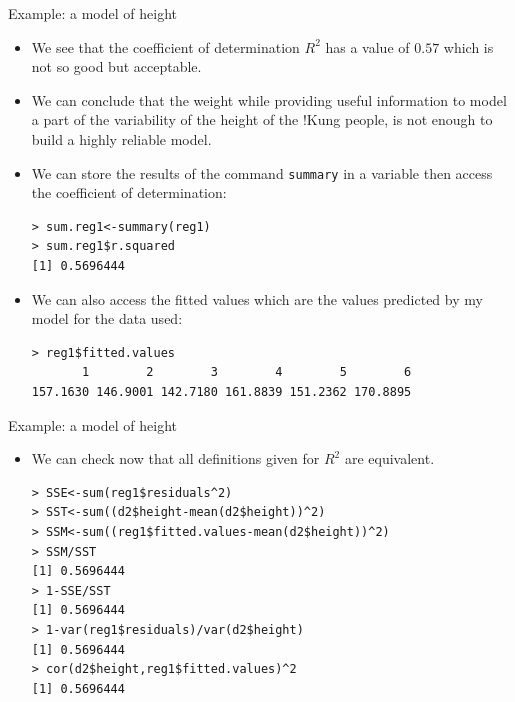\documentclass[handout]{beamer}
\begin{document}
\begin{frame}[fragile]{Example: a model of height}
\scriptsize{
\begin{itemize}
 \item We see that the coefficient of determination $R^2$ has a value of $0.57$ which is not so good but acceptable.
 
 
  \item We can conclude that the weight while providing useful information to model a part of the variability of the height of the !Kung people, is not enough to build a highly reliable model. 
  
  \item We can store the results of the command \verb+summary+ in a variable then access the coefficient of determination:
\begin{verbatim}
> sum.reg1<-summary(reg1)
> sum.reg1$r.squared
[1] 0.5696444  
\end{verbatim}

\item  We can also access the fitted values which are the values predicted by my model for the data used:
\begin{verbatim}
> reg1$fitted.values
       1        2        3        4        5        6      
157.1630 146.9001 142.7180 161.8839 151.2362 170.8895 
\end{verbatim}
 
 \end{itemize}
 

} 
\end{frame}



\begin{frame}[fragile]{Example: a model of height}
\scriptsize{
\begin{itemize}
 \item We can check now that all definitions given for $R^2$ are equivalent.
 
 \begin{verbatim}
> SSE<-sum(reg1$residuals^2)
> SST<-sum((d2$height-mean(d2$height))^2)
> SSM<-sum((reg1$fitted.values-mean(d2$height))^2)
> SSM/SST
[1] 0.5696444
> 1-SSE/SST
[1] 0.5696444
> 1-var(reg1$residuals)/var(d2$height)
[1] 0.5696444
> cor(d2$height,reg1$fitted.values)^2
[1] 0.5696444
 \end{verbatim}

 
 \end{itemize}
 

} 
\end{frame}
\end{document}
